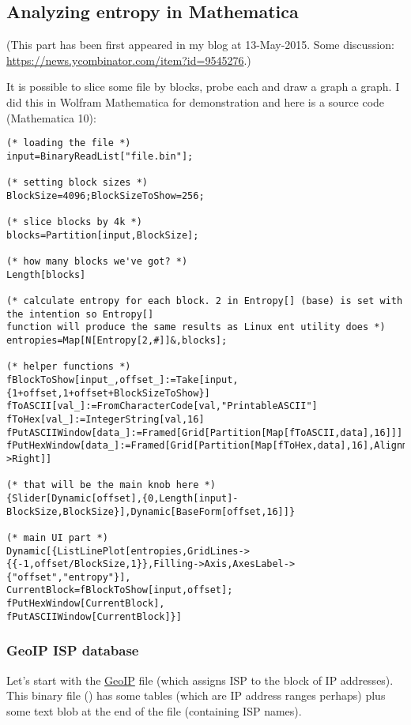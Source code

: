 \subsection{Analyzing entropy in Mathematica}

(This part has been first appeared in my blog at 13-May-2015.
Some discussion: \url{https://news.ycombinator.com/item?id=9545276}.)

It is possible to slice some file by blocks, probe each and draw a graph a graph.
I did this in Wolfram Mathematica for demonstration and here is a source code (Mathematica 10):

\begin{lstlisting}[style=custommath]
(* loading the file *)
input=BinaryReadList["file.bin"];

(* setting block sizes *)
BlockSize=4096;BlockSizeToShow=256;

(* slice blocks by 4k *)
blocks=Partition[input,BlockSize];

(* how many blocks we've got? *)
Length[blocks]

(* calculate entropy for each block. 2 in Entropy[] (base) is set with the intention so Entropy[] 
function will produce the same results as Linux ent utility does *)
entropies=Map[N[Entropy[2,#]]&,blocks];

(* helper functions *)
fBlockToShow[input_,offset_]:=Take[input,{1+offset,1+offset+BlockSizeToShow}]
fToASCII[val_]:=FromCharacterCode[val,"PrintableASCII"]
fToHex[val_]:=IntegerString[val,16]
fPutASCIIWindow[data_]:=Framed[Grid[Partition[Map[fToASCII,data],16]]]
fPutHexWindow[data_]:=Framed[Grid[Partition[Map[fToHex,data],16],Alignment->Right]]

(* that will be the main knob here *)
{Slider[Dynamic[offset],{0,Length[input]-BlockSize,BlockSize}],Dynamic[BaseForm[offset,16]]}

(* main UI part *)
Dynamic[{ListLinePlot[entropies,GridLines->{{-1,offset/BlockSize,1}},Filling->Axis,AxesLabel->{"offset","entropy"}],
CurrentBlock=fBlockToShow[input,offset];
fPutHexWindow[CurrentBlock],
fPutASCIIWindow[CurrentBlock]}]
\end{lstlisting}

\subsubsection{GeoIP ISP database}

Let's start with the \href{https://www.maxmind.com/en/geoip-demo}{GeoIP} file (which assigns ISP to the block of IP addresses).
This binary file () has some tables (which are IP address ranges perhaps) plus some text blob at the end of the file
(containing ISP names).

